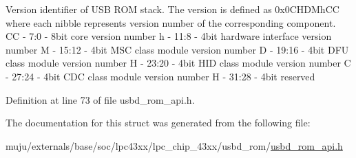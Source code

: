 Version identifier of U\+SB R\+OM stack. The version is defined as 0x0\+C\+H\+D\+Mh\+CC where each nibble represents version number of the corresponding component. CC -\/ 7\+:0 -\/ 8bit core version number h -\/ 11\+:8 -\/ 4bit hardware interface version number M -\/ 15\+:12 -\/ 4bit M\+SC class module version number D -\/ 19\+:16 -\/ 4bit D\+FU class module version number H -\/ 23\+:20 -\/ 4bit H\+ID class module version number C -\/ 27\+:24 -\/ 4bit C\+DC class module version number H -\/ 31\+:28 -\/ 4bit reserved 

Definition at line 73 of file usbd\+\_\+rom\+\_\+api.\+h.



The documentation for this struct was generated from the following file\+:\begin{DoxyCompactItemize}
\item 
muju/externals/base/soc/lpc43xx/lpc\+\_\+chip\+\_\+43xx/usbd\+\_\+rom/\hyperlink{usbd__rom__api_8h}{usbd\+\_\+rom\+\_\+api.\+h}\end{DoxyCompactItemize}
